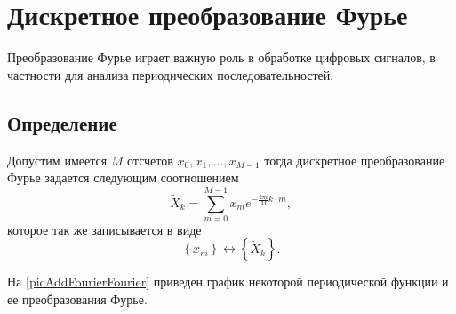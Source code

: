 \section{Дискретное преобразование Фурье}
\label{AddFourier}

Преобразование Фурье играет важную
роль в обработке цифровых сигналов, в частности для анализа
периодических последовательностей.
\subsection{Определение}
\begin{definition}
Допустим имеется $M$ отсчетов $x_0, x_1, \dots, x_{M-1}$ тогда
дискретное преобразование Фурье задается следующим соотношением
\begin{equation}
\tilde{X}_k = \sum^{M - 1}_{m = 0} x_m e^{-\frac{2 \pi i}{M} k\cdot m},
\label{eqAddFourierDiscretFourier}
\end{equation}
которое так же записывается в виде
\begin{equation}
\left\{x_m\right\} \longleftrightarrow \left\{\tilde{X}_k\right\}.
\nonumber
\end{equation}
\end{definition}

На \autoref{picAddFourierFourier} приведен график некоторой
периодической функции и ее преобразования Фурье. 



